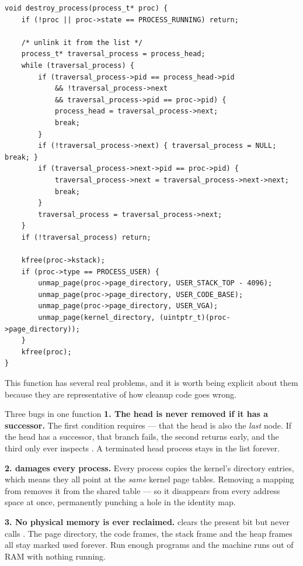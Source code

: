 \begin{lstlisting}[style=c]
void destroy_process(process_t* proc) {
    if (!proc || proc->state == PROCESS_RUNNING) return;

    /* unlink it from the list */
    process_t* traversal_process = process_head;
    while (traversal_process) {
        if (traversal_process->pid == process_head->pid
            && !traversal_process->next
            && traversal_process->pid == proc->pid) {
            process_head = traversal_process->next;
            break;
        }
        if (!traversal_process->next) { traversal_process = NULL; break; }
        if (traversal_process->next->pid == proc->pid) {
            traversal_process->next = traversal_process->next->next;
            break;
        }
        traversal_process = traversal_process->next;
    }
    if (!traversal_process) return;

    kfree(proc->kstack);
    if (proc->type == PROCESS_USER) {
        unmap_page(proc->page_directory, USER_STACK_TOP - 4096);
        unmap_page(proc->page_directory, USER_CODE_BASE);
        unmap_page(proc->page_directory, USER_VGA);
        unmap_page(kernel_directory, (uintptr_t)(proc->page_directory));
    }
    kfree(proc);
}
\end{lstlisting}

This function has several real problems, and it is worth being explicit about them because they are
representative of how cleanup code goes wrong.

\begin{danger}{Three bugs in one function}
\textbf{1. The head is never removed if it has a successor.} The first condition requires
 --- that the head is also the \emph{last} node. If the head has a
successor, that branch fails, the second returns early, and the third only ever inspects
. A terminated head process stays in the list forever.

\textbf{2.  damages every process.} Every process copies the
kernel's directory entries, which means they all point at the \emph{same} kernel page tables.
Removing a mapping from  removes it from the shared table --- so it
disappears from every address space at once, permanently punching a hole in the identity map.

\textbf{3. No physical memory is ever reclaimed.}  clears the present bit but never
calls . The page directory, the code frames, the stack frame and the heap frames
all stay marked used forever. Run enough programs and the machine runs out of RAM with nothing
running.
\end{danger}


